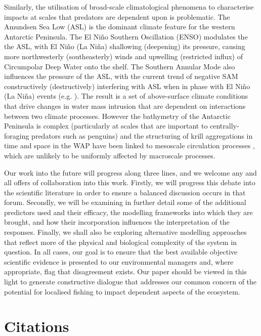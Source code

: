 \documentclass[]{elsarticle} %
\begin{document}
Similarly, the utilisation of broad-scale climatological phenomena to
characterise impacts at scales that predators are dependent upon is
problematic. The Amundsen Sea Low (ASL) is the dominant climate feature
for the western Antarctic Peninsula. The El Niño Southern Oscillation
(ENSO) modulates the the ASL, with El Niño (La Niña) shallowing
(deepening) its pressure, causing more northwesterly (southeasterly)
winds and upwelling (restricted influx) of Circumpolar Deep Water onto
the shelf. The Southern Annular Mode also influences the pressure of the
ASL, with the current trend of negative SAM constructively
(destructively) interfering with ASL when in phase with El Niño (La
Niña) events (e.g. \citet{Clem2016}). The result is a set of
above-surface climate conditions that drive changes in water mass
intrusion that are dependent on interactions between two climate
processes. However the bathymetry of the Antarctic Peninsula is complex
(particularly at scales that are important to centrally-foraging
predators such as penguins) and the structuring of krill aggregations in
time and space in the WAP have been linked to mesoscale circulation
processes \citep{santoraKrillSpaceComparative2012}, which are unlikely
to be uniformly affected by macroscale processes.

Our work into the future will progress along three lines, and we welcome
any and all offers of collaboration into this work. Firstly, we will
progress this debate into the scientific literature in order to ensure a
balanced discussion occurs in that forum. Secondly, we will be examining
in further detail some of the additional predictors used and their
efficacy, the modelling frameworks into which they are brought, and how
their incorporation influences the interpretation of the responses.
Finally, we shall also be exploring alternative modelling approaches
that reflect more of the physical and biological complexity of the
system in question. In all cases, our goal is to ensure that the best
available objective scientific evidence is presented to our
environmental managers and, where appropriate, flag that disagreement
exists. Our paper should be viewed in this light to generate
constructive dialogue that addresses our common concern of the potential
for localised fishing to impact dependent aspects of the ecosystem.\\
\newpage

\section{Citations}\label{citations}
\end{document}
